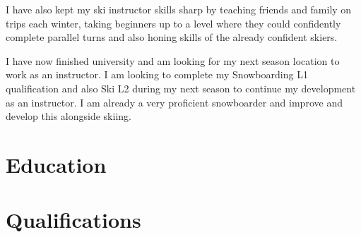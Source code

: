 \documentclass[letterpaper]{twentysecondcv} %
\begin{document}
I have also kept my ski instructor skills sharp by teaching friends and family on trips each winter, taking beginners up to a level where they could confidently complete parallel turns and also honing skills of the already confident skiers.

I have now finished university and am looking for my next season location to work as an instructor. I am looking to complete my Snowboarding L1 qualification and also Ski L2 during my next season to continue my development as an instructor. I am already a very proficient snowboarder and improve and develop this alongside skiing.


\section{Education}

\begin{twenty} %
\end{twenty}



\section{Qualifications}

\begin{twentyshort} %
\end{twentyshort}

\end{document}
